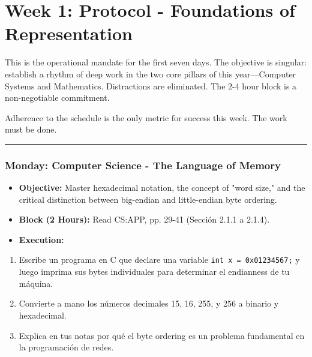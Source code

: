 \section{Week 1: Protocol - Foundations of Representation}

This is the operational mandate for the first seven days. The objective is singular: establish a rhythm of deep work in the two core pillars of this year—Computer Systems and Mathematics. Distractions are eliminated. The 2-4 hour block is a non-negotiable commitment.

Adherence to the schedule is the only metric for success this week. The work must be done.

\noindent\rule{\textwidth}{0.4pt}

\subsubsection{\textbf{Monday: Computer Science - The Language of Memory}}
\begin{itemize}
  \item \textbf{Objective:} Master hexadecimal notation, the concept of "word size," and the critical distinction between big-endian and little-endian byte ordering.
  \item \textbf{Block (2 Hours):} Read CS:APP, pp. 29-41 (Sección 2.1.1 a 2.1.4).
  \item \textbf{Execution:}
\end{itemize}
\begin{enumerate}
  \item Escribe un programa en C que declare una variable \texttt{int x = 0x01234567;} y luego imprima sus bytes individuales para determinar el endianness de tu máquina.
  \item Convierte a mano los números decimales 15, 16, 255, y 256 a binario y hexadecimal.
  \item Explica en tus notas por qué el byte ordering es un problema fundamental en la programación de redes.

\end{enumerate}
